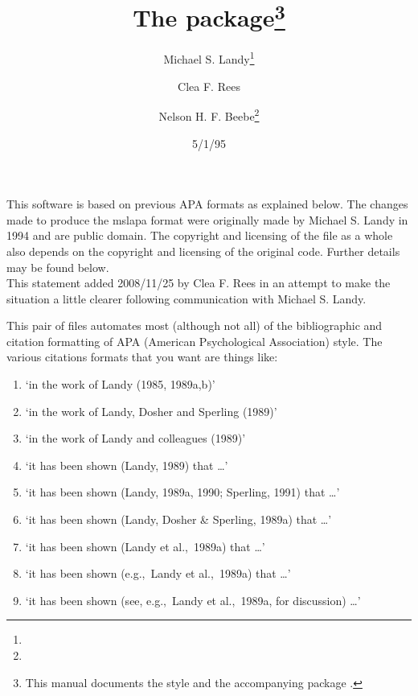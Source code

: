 \documentclass[DIV=9, parskip=half, pagesize=auto]{scrartcl}
\title{The \pkg{mslapa} package\thanks{This manual documents the \BibTeX style \pkg{mslapa.bst} and the accompanying package \pkg{mslapa.sty}.}}
\author{Michael S. Landy\thanks{\mail{landy@nyu.edu}}\and Clea F. Rees\and Nelson H. F. Beebe\thanks{\mail{beebe@plot79.math.utah.edu}}}
\date{5/1/95}
\newcommand*{\pkg}[1]{\textsf{#1}}
\begin{document}
\maketitle

\noindent
This software is based on previous APA formats as explained below. The
changes made to produce the \pkg{mslapa} format were originally made by Michael S.
Landy in 1994 and are public domain. The copyright and licensing of the file
as a whole also depends on the copyright and licensing of the original code.
Further details may be found below.\\
This statement added 2008/11/25 by Clea F. Rees in an attempt to make the
situation a little clearer following communication with Michael S. Landy.

This pair of files automates most (although not all) of the bibliographic
and citation formatting of APA (American Psychological Association) style.
The various citations formats that you want are things like:
%
\begin{enumerate}
\item \label{item:1} `in the work of Landy (1985, 1989a,b)' 
\item \label{item:2} `in the work of Landy, Dosher and Sperling (1989)' 
\item \label{item:3} `in the work of Landy and colleagues (1989)' 
\item \label{item:4} `it has been shown (Landy, 1989) that \ldots' 
\item \label{item:5} `it has been shown (Landy, 1989a, 1990; Sperling, 1991) that \ldots' 
\item \label{item:6} `it has been shown (Landy, Dosher \& Sperling, 1989a) that \ldots' 
\item \label{item:7} `it has been shown (Landy et al.,\ 1989a) that \ldots' 
\item \label{item:8} `it has been shown (e.g.,\ Landy et al.,\ 1989a) that \ldots' 
\item \label{item:9} `it has been shown (see, e.g.,\ Landy et al.,\ 1989a, for discussion) \ldots' 
\end{enumerate}

\pagebreak[2]
\end{document}
